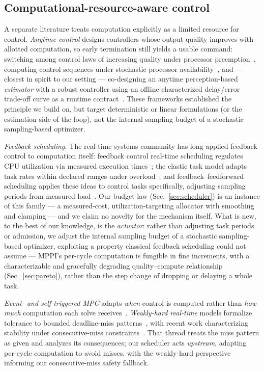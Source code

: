 \documentclass[conference]{IEEEtran}
\begin{document}
\subsection{Computational-resource-aware control}

A separate literature treats computation explicitly as a limited resource
for control. \emph{Anytime control} designs controllers whose output
quality improves with allotted computation, so early termination still
yields a usable command: switching among control laws of increasing
quality under processor preemption~\cite{fontanelli2008anytime},
computing control sequences under stochastic processor
availability~\cite{quevedo2013sequence}, and --- closest in spirit to our
setting --- co-designing an anytime perception-based \emph{estimator}
with a robust controller using an offline-characterized delay/error
trade-off curve as a runtime contract~\cite{pant2021anytime}. These
frameworks established the principle we build on, but target
deterministic or linear formulations (or the estimation side of the
loop), not the internal sampling budget of a stochastic sampling-based
optimizer.

\emph{Feedback scheduling.} The real-time systems community has long
applied feedback control to computation itself: feedback control
real-time scheduling regulates CPU utilization via measured execution
times~\cite{lu2002feedback}; the elastic task model adapts task rates
within declared ranges under overload~\cite{buttazzo1998elastic}; and
feedback--feedforward scheduling applies these ideas to control tasks
specifically, adjusting sampling periods from measured
load~\cite{cervin2002feedback}. Our budget law
(Sec.~\ref{sec:scheduler}) is an instance of this family --- a
measured-cost, utilization-targeting allocator with smoothing and
clamping --- and we claim no novelty for the mechanism itself. What is
new, to the best of our knowledge, is the \emph{actuator}: rather than
adjusting task periods or admission, we adjust the internal sampling
budget of a stochastic sampling-based optimizer, exploiting a property
classical feedback scheduling could not assume --- MPPI's per-cycle
computation is fungible in fine increments, with a characterizable and
gracefully degrading quality--compute relationship
(Sec.~\ref{sec:pareto}), rather than the step change of dropping or
delaying a whole task.

\emph{Event- and self-triggered MPC} adapts \emph{when} control is
computed rather than \emph{how much} computation each solve
receives~\cite{heemels2012introduction,gommans2015resource}.
\emph{Weakly-hard real-time} models formalize tolerance to bounded
deadline-miss patterns~\cite{bernat2001weakly}, with recent work
characterizing stability under consecutive-miss
constraints~\cite{maggio2020control}. That thread treats the miss pattern
as given and analyzes its consequences; our scheduler acts
\emph{upstream}, adapting per-cycle computation to avoid misses, with the
weakly-hard perspective informing our consecutive-miss safety fallback.
\end{document}
